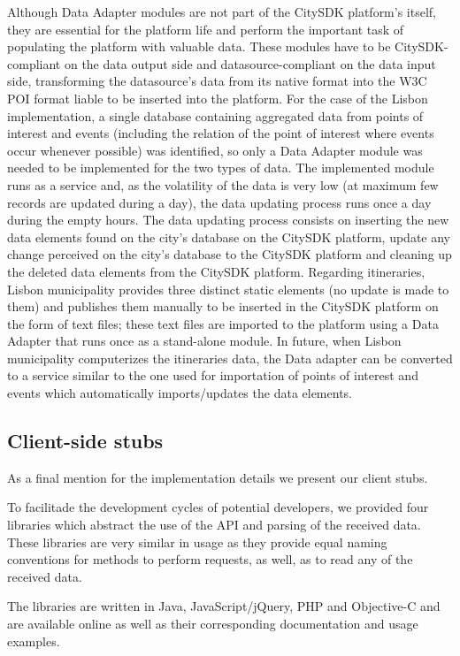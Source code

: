 \documentclass[times]{ettauth}
\begin{document}
Although Data Adapter modules are not part of the CitySDK platform's itself, they are essential for the platform life and perform the important task of populating the platform with valuable data. These modules have to be CitySDK-compliant on the data output side and datasource-compliant on the data input side, transforming the datasource's data from its native format into the W3C POI format liable to be inserted into the platform. For the case of the Lisbon implementation, a single database containing aggregated data from points of interest and events (including the relation of the point of interest where events occur whenever possible) was identified, so only a Data Adapter module was needed to be implemented for the two types of data. The implemented module runs as a service and, as the volatility of the data is very low (at maximum few records are updated during a day), the data updating process runs once a day during the empty hours. The data updating process consists on inserting the new data elements found on the city's database on the CitySDK platform, update any change perceived on the city's database to the CitySDK platform and cleaning up the deleted data elements from the CitySDK platform. Regarding itineraries, Lisbon municipality provides three distinct static elements (no update is made to them) and publishes them manually to be inserted in the CitySDK platform on the form of text files; these text files are imported to the platform using a Data Adapter that runs once as a stand-alone module. In future, when Lisbon municipality computerizes the itineraries data, the Data adapter can be converted to a service similar to the one used for importation of points of interest and events which automatically imports/updates the data elements.

\subsection{Client-side stubs}
As a final mention for the implementation details we present our client stubs. 

To facilitade the development cycles of potential developers, we provided four libraries which abstract the use of the API and parsing of the received data. These libraries are very similar in usage as they provide equal naming conventions for methods to perform requests, as well, as to read any of the received data.

The libraries are written in Java, JavaScript/jQuery, PHP and Objective-C and are available online as well as their corresponding documentation and usage examples.
\end{document}
